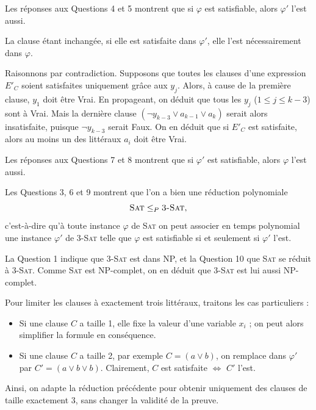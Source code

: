 \begin{corrections}
\begin{questions}
  \item Les réponses aux Questions 4 et 5 montrent que si $\varphi$ est satisfiable, alors $\varphi'$ l’est aussi.

  \item La clause étant inchangée, si elle est satisfaite dans $\varphi'$, elle l’est nécessairement dans $\varphi$.

  \item Raisonnons par contradiction.  
    Supposons que toutes les clauses d’une expression $E'_C$ soient satisfaites uniquement grâce aux $y_j$.  
    Alors, à cause de la première clause, $y_1$ doit être Vrai. En propageant, on déduit que tous les $y_j$ ($1 \le j \le k-3$) sont à Vrai.  
    Mais la dernière clause $(\neg y_{k-3} \lor a_{k-1} \lor a_k)$ serait alors insatisfaite, puisque $\neg y_{k-3}$ serait Faux.  
    On en déduit que si $E'_C$ est satisfaite, alors au moins un des littéraux $a_i$ doit être Vrai.

  \item Les réponses aux Questions 7 et 8 montrent que si $\varphi'$ est satisfiable, alors $\varphi$ l’est aussi.

  \item Les Questions 3, 6 et 9 montrent que l’on a bien une réduction polynomiale
    \[
      \textsc{Sat} \le_P \textsc{3-Sat},
    \]
    c’est-à-dire qu’à toute instance $\varphi$ de \textsc{Sat} on peut associer en temps polynomial une instance $\varphi'$ de \textsc{3-Sat}
    telle que $\varphi$ est satisfiable si et seulement si $\varphi'$ l’est.

  \item La Question 1 indique que \textsc{3-Sat} est dans NP, et la Question 10 que \textsc{Sat} se réduit à \textsc{3-Sat}.  
    Comme \textsc{Sat} est NP-complet, on en déduit que \textsc{3-Sat} est lui aussi NP-complet.

  \item Pour limiter les clauses à exactement trois littéraux, traitons les cas particuliers :
    \begin{itemize}
      \item Si une clause $C$ a taille 1, elle fixe la valeur d’une variable $x_i$ ; on peut alors simplifier la formule en conséquence.
      \item Si une clause $C$ a taille 2, par exemple $C = (a \lor b)$, on remplace dans $\varphi'$ par $C' = (a \lor b \lor b)$.  
            Clairement, $C$ est satisfaite $\Leftrightarrow$ $C'$ l’est.
    \end{itemize}
    Ainsi, on adapte la réduction précédente pour obtenir uniquement des clauses de taille exactement 3, sans changer la validité de la preuve.


\end{questions}
\end{corrections}
